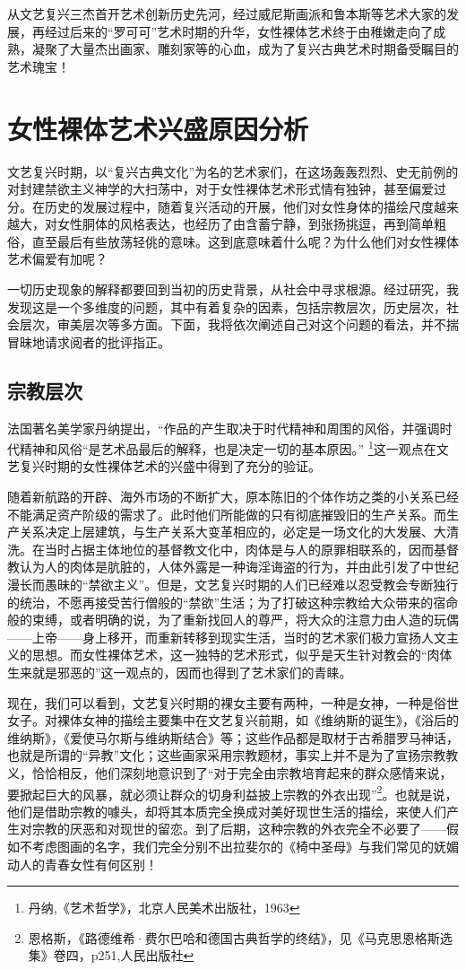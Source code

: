 \documentclass[UTF8,a4paper]{ctexart}
\begin{document}
从文艺复兴三杰首开艺术创新历史先河，经过威尼斯画派和鲁本斯等艺术大家的发展，再经过后来的``罗可可''艺术时期的升华，女性裸体艺术终于由稚嫩走向了成熟，凝聚了大量杰出画家、雕刻家等的心血，成为了复兴古典艺术时期备受瞩目的艺术瑰宝！

\section{女性裸体艺术兴盛原因分析}
文艺复兴时期，以“复兴古典文化”为名的艺术家们，在这场轰轰烈烈、史无前例的对封建禁欲主义神学的大扫荡中，对于女性裸体艺术形式情有独钟，甚至偏爱过分。在历史的发展过程中，随着复兴活动的开展，他们对女性身体的描绘尺度越来越大，对女性胴体的风格表达，也经历了由含蓄宁静，到张扬挑逗，再到简单粗俗，直至最后有些放荡轻佻的意味。这到底意味着什么呢？为什么他们对女性裸体艺术偏爱有加呢？

一切历史现象的解释都要回到当初的历史背景，从社会中寻求根源。经过研究，我发现这是一个多维度的问题，其中有着复杂的因素，包括宗教层次，历史层次，社会层次，审美层次等多方面。下面，我将依次阐述自己对这个问题的看法，并不揣冒昧地请求阅者的批评指正。

\subsection{宗教层次}
法国著名美学家丹纳提出，“作品的产生取决于时代精神和周围的风俗，并强调时代精神和风俗“是艺术品最后的解释，也是决定一切的基本原因。” \footnote{丹纳,《艺术哲学》，北京人民美术出版社，1963}这一观点在文艺复兴时期的女性裸体艺术的兴盛中得到了充分的验证。

随着新航路的开辟、海外市场的不断扩大，原本陈旧的个体作坊之类的小关系已经不能满足资产阶级的需求了。此时他们所能做的只有彻底摧毁旧的生产关系。而生产关系决定上层建筑，与生产关系大变革相应的，必定是一场文化的大发展、大清洗。在当时占据主体地位的基督教文化中，肉体是与人的原罪相联系的，因而基督教认为人的肉体是肮脏的，人体外露是一种诲淫诲盗的行为，并由此引发了中世纪漫长而愚昧的“禁欲主义”。但是，文艺复兴时期的人们已经难以忍受教会专断独行的统治，不愿再接受苦行僧般的“禁欲”生活；为了打破这种宗教给大众带来的宿命般的束缚，或者明确的说，为了重新找回人的尊严，将大众的注意力由人造的玩偶——上帝——身上移开，而重新转移到现实生活，当时的艺术家们极力宣扬人文主义的思想。而女性裸体艺术，这一独特的艺术形式，似乎是天生针对教会的“肉体生来就是邪恶的”这一观点的，因而也得到了艺术家们的青睐。

现在，我们可以看到，文艺复兴时期的裸女主要有两种，一种是女神，一种是俗世女子。对裸体女神的描绘主要集中在文艺复兴前期，如《维纳斯的诞生》，《浴后的维纳斯》，《爱使马尔斯与维纳斯结合》等；这些作品都是取材于古希腊罗马神话，也就是所谓的“异教”文化；这些画家采用宗教题材，事实上并不是为了宣扬宗教教义，恰恰相反，他们深刻地意识到了“对于完全由宗教培育起来的群众感情来说，要掀起巨大的风暴，就必须让群众的切身利益披上宗教的外衣出现”\footnote{恩格斯，《路德维希·费尔巴哈和德国古典哲学的终结》，见《马克思恩格斯选集》卷四，p251,人民出版社}。也就是说，他们是借助宗教的噱头，却将其本质完全换成对美好现世生活的描绘，来使人们产生对宗教的厌恶和对现世的留恋。到了后期，这种宗教的外衣完全不必要了——假如不考虑图画的名字，我们完全分别不出拉斐尔的《椅中圣母》与我们常见的妩媚动人的青春女性有何区别！
\end{document}
